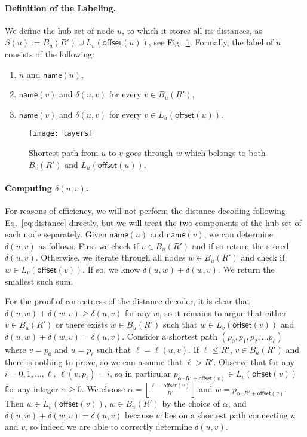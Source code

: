 \documentclass{article}[11pt,letter]
\newcommand{\symb}{R}
\newcommand{\offset}{\mathsf{offset}}
\newcommand{\name}{\mathsf{name}}
\newcommand{\cost}{\delta}
\newcommand{\length}{\ell}
\begin{document}
\paragraph{Definition of the Labeling.} We define the hub set of node $u$, to which it stores all its distances, as $S(u) := B_u(\symb') \cup L_u(\offset(u))$, see Fig.~\ref{fig:layers}. Formally, the label of $u$ consists of the following:
\begin{enumerate}
\item $n$ and $\name(u)$,
\item $\name(v)$ and $\cost(u,v)$ for every $v\in B_u(\symb')$,
\item $\name(v)$ and $\cost(u,v)$ for every $v\in L_u(\offset(u))$.
\end{enumerate}

\begin{figure}[t]
  \centering
    \vspace*{-2mm}
    \texttt{[image: layers]}
    \vspace*{-2mm}
    \caption{Shortest path from $u$ to $v$ goes through $w$ which belongs to both $B_v(\symb')$ and $L_u(\offset(u))$.}
    \label{fig:layers}
\end{figure}


\paragraph{Computing $\cost(u,v)$.} For reasons of efficiency, we will not perform the distance decoding following Eq.~\eqref{eq:distance} directly, but we will treat the two components of the hub set of each node separately. Given $\name(u)$ and $\name(v)$, we can determine
$\cost(u,v)$ as follows. First we check if $v\in B_u(\symb')$ and if so return the stored $\cost(u,v)$.
Otherwise, we iterate through all nodes $w\in B_u(\symb')$ and check if $w \in L_v(\offset(v))$.
If so, we know $\cost(u,w)+\cost(w,v)$. We return the smallest such sum.

For the proof of correctness of the distance decoder, it is clear that $\cost(u,w)+\cost(w,v)\geq \cost(u,v)$ for any $w$, so it remains to argue that either $v \in B_u(\symb')$ or there exists $w\in B_u(\symb')$ such that $w\in L_v(\offset(v))$ and
$\cost(u,w)+\cost(w,v)=\cost(u,v)$. Consider a shortest path $(p_0, p_1, p_2, \ldots p_\length)$ where $v=p_0$ and $u=p_\length$ such that $\length = \length(u,v)$. If  $\length \leq \symb'$, $v\in B_u(\symb')$ and there is nothing to prove,
so we can assume that $\length > \symb'$.  Observe that for any $i=0,1,\ldots,\length$, $\length(v,p_i)=i$,
so in particular $p_{\alpha\cdot \symb'+\offset(v)}\in L_v(\offset(v))$ for any integer $\alpha \geq 0$.
We choose $\alpha=\left\lfloor \frac{\length-\offset(v)}{\symb'}\right\rfloor$ and $w=p_{\alpha \cdot \symb'+\offset(v)}$.
Then $w\in L_v(\offset(v))$, $w\in B_u(\symb')$ by the choice of $\alpha$, and $\cost(u,w)+\cost(w,v) = \cost(u,v)$
because $w$ lies on a shortest path connecting $u$ and $v$, so indeed we are able to correctly
determine $\cost(u,v)$.
\end{document}
